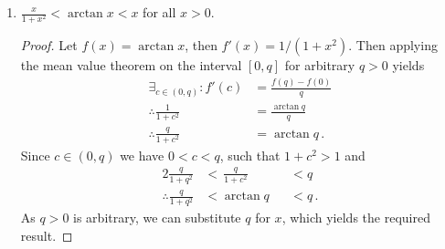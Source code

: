 \documentclass[week=6]{homework}
\begin{document}
\begin{questions}
\begin{enumerate}[label=(\alph*)]
\begin{proof}
	    		Now apply the mean value theorem to the interval $[q,0]$, for arbitrary $q<0$. Then
	    		\begin{align*}
		    		\exists_{c \in (q,0)}: f'(c) &= \frac{f(q)-f(0)}{q} \\
		    		\therefore -e^{-c} &= \frac{e^{-q} - 1}{q} \\
		    		\therefore -1 &> \frac{e^{-q} - 1}{q} \\
		    		\therefore 1-q &< e^{-q}\,,
	    		\end{align*}
	    		using $q < 0$ and $e^{-c} > 1$ for $c < 0$, which is true for $c \in (q,0)$. As $q$ is arbitrary, we now have
	    		\[
		    		\forall_{x \in \reals}: 1-x \leq e^{-x}\,.
	    		\]
	    	\end{proof}
	    	
	    	\item
	    	\begin{inlinetoprove}
	    		$ \displaystyle \frac{x}{1 + x^2} < \arctan x < x$ for all $x>0$.
	    	\end{inlinetoprove}
	    	\begin{proof}
	    		Let $f(x) = \arctan x$, then $f'(x) = 1/(1+x^2)$. Then applying the mean value theorem on the interval $[0,q]$ for arbitrary $q > 0$ yields
	    		\begin{align*}
	    			\exists_{c \in (0,q)}: f'(c) &= \frac{f(q)-f(0)}{q} \\
		    		\therefore \frac{1}{1+c^2} &= \frac{\arctan q}{q} \\
		    		\therefore \frac{q}{1+c^2} &= \arctan q\,.
	    		\end{align*}
	    		Since $c \in (0,q)$ we have $0 < c < q$, such that $1 + c^2 > 1$ and 
	    		\begin{alignat*}{2}
		    		\frac{q}{1+q^2} &< \hspace{2pt} \frac{q}{1+c^2} &&< q \\
			    	 \therefore	\frac{q}{1+q^2} &< \arctan q &&< q\,. 
	    		\end{alignat*}
	    		As $q > 0$ is arbitrary, we can substitute $q$ for $x$, which yields the required result.
	    	\end{proof}
	    	

\end{enumerate}
\end{questions}
\end{document}
